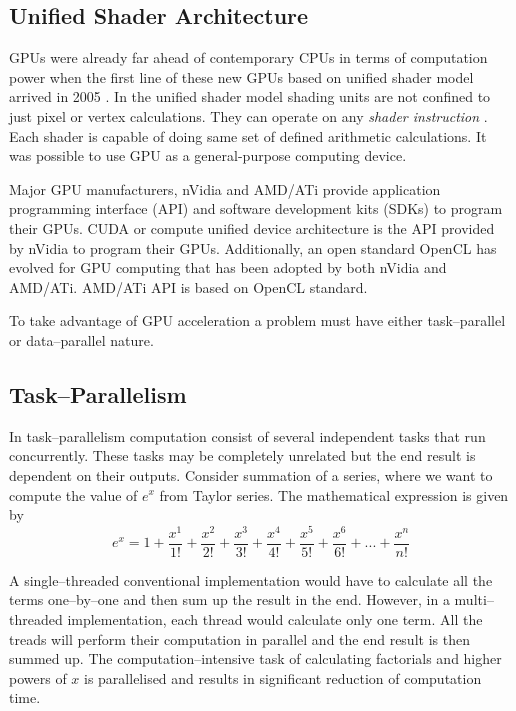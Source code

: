 \subsection{Unified Shader Architecture}
GPUs were already far ahead of contemporary CPUs in terms of computation power when the first line of these new GPUs based on unified shader model arrived in 2005 \cite{Ref:Unified-Shader-Architecture-devmaster.net}. In the unified shader model shading units are not confined to just pixel or vertex calculations. They can operate on any \emph{shader instruction} \cite{Ref:Unified-Shader-Model-wiki}. Each shader is capable of doing same set of defined arithmetic calculations. It was possible to use GPU as a general-purpose computing device.

Major GPU manufacturers, nVidia and AMD/ATi provide application programming interface (API) and software development kits (SDKs) to program their GPUs. CUDA or compute unified device architecture is the API provided by nVidia to program their GPUs. Additionally, an open standard OpenCL has evolved for GPU computing that has been adopted by both nVidia and AMD/ATi. AMD/ATi API is based on OpenCL standard.

To take advantage of GPU acceleration a problem must have either task--parallel or data--parallel nature.
\subsection{Task--Parallelism}
In task--parallelism computation consist of several independent tasks that run concurrently. These tasks may be completely unrelated but the end result is dependent on their outputs. Consider summation of a series, where we want to compute the value of $e^x$ from Taylor series. The mathematical expression is given by
\begin{equation}
e^x = 1+\dfrac{x^1}{1!}+\dfrac{x^2}{2!}+\dfrac{x^3}{3!}+\dfrac{x^4}{4!}+\dfrac{x^5}{5!}+\dfrac{x^6}{6!}+...+\dfrac{x^n}{n!}
\label{eq:ex-Taylor-Series}
\end{equation}

A single--threaded conventional implementation would have to calculate all the terms one--by--one and then sum up the result in the end. However, in a multi--threaded implementation, each thread would calculate only one term. All the treads will perform their computation in parallel and the end result is then summed up. The computation--intensive task of calculating factorials and higher powers of $x$ is parallelised and results in significant reduction of computation time.
